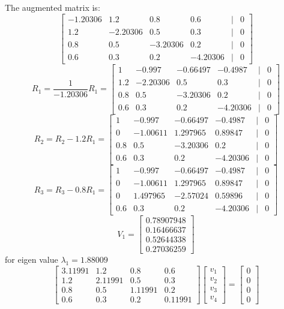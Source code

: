 \documentclass[a3paper,12pt]{extarticle} %
\begin{document}
\begin{enumerate}
\begin{enumerate}
\[        \]
        The augmented matrix is:
        \[
        \begin{bmatrix}-1.20306 & 1.2 & 0.8 & 0.6 & | & 0\\1.2 & -2.20306 & 0.5 & 0.3 & | & 0\\0.8 & 0.5 & -3.20306 & 0.2 & | & 0\\0.6 & 0.3 & 0.2 & -4.20306 & | & 0\end{bmatrix}
        \]
        \[
        R_1 = \frac{1}{-1.20306}R_1 = \begin{bmatrix}1 & -0.997 & -0.66497 & -0.4987 & | & 0\\1.2 & -2.20306 & 0.5 & 0.3 & | & 0\\0.8 & 0.5 & -3.20306 & 0.2 & | & 0\\0.6 & 0.3 & 0.2 & -4.20306 & | & 0\end{bmatrix}
        \]
        \[
        R_2 = R_2 - 1.2R_1 = \begin{bmatrix}1 & -0.997 & -0.66497 & -0.4987 & | & 0\\0 & -1.00611 & 1.297965 & 0.89847 & | & 0\\0.8 & 0.5 & -3.20306 & 0.2 & | & 0\\0.6 & 0.3 & 0.2 & -4.20306 & | & 0\end{bmatrix}
        \]
        \[
        R_3 = R_3 - 0.8R_1 = \begin{bmatrix}1 & -0.997 & -0.66497 & -0.4987 & | & 0\\0 & -1.00611 & 1.297965 & 0.89847 & | & 0\\0 & 1.497965 & -2.57024 & 0.59896 & | & 0\\0.6 & 0.3 & 0.2 & -4.20306 & | & 0\end{bmatrix}
        \]
        \[
        V_1 = \begin{bmatrix}0.78907948\\0.16466637\\0.52644338\\0.27036259\end{bmatrix}
        \]
        for eigen value \(\lambda_1 = 1.88009\)
        \[
        \begin{bmatrix}3.11991 & 1.2 & 0.8 & 0.6\\1.2 & 2.11991 & 0.5 & 0.3\\0.8 & 0.5 & 1.11991 & 0.2\\0.6 & 0.3 & 0.2 & 0.11991\end{bmatrix} \begin{bmatrix}v_1\\v_2\\v_3\\v_4\end{bmatrix} = \begin{bmatrix}0\\0\\0\\0\end{bmatrix}
\]
\end{enumerate}
\end{enumerate}
\end{document}
